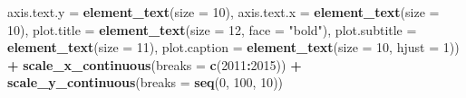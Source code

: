 \documentclass[
]{article}
\newenvironment{Shaded}{\begin{snugshade}}{\end{snugshade}}
\newcommand{\AttributeTok}[1]{\textcolor[rgb]{0.13,0.29,0.53}{#1}}
\newcommand{\DecValTok}[1]{\textcolor[rgb]{0.00,0.00,0.81}{#1}}
\newcommand{\FunctionTok}[1]{\textcolor[rgb]{0.13,0.29,0.53}{\textbf{#1}}}
\newcommand{\NormalTok}[1]{#1}
\newcommand{\SpecialCharTok}[1]{\textcolor[rgb]{0.81,0.36,0.00}{\textbf{#1}}}
\newcommand{\StringTok}[1]{\textcolor[rgb]{0.31,0.60,0.02}{#1}}
\begin{document}
\begin{Shaded}
\begin{Highlighting}[]
    \AttributeTok{axis.text.y =} \FunctionTok{element\_text}\NormalTok{(}\AttributeTok{size =} \DecValTok{10}\NormalTok{), }\AttributeTok{axis.text.x =} \FunctionTok{element\_text}\NormalTok{(}\AttributeTok{size =} \DecValTok{10}\NormalTok{),}
    \AttributeTok{plot.title =} \FunctionTok{element\_text}\NormalTok{(}\AttributeTok{size =} \DecValTok{12}\NormalTok{, }\AttributeTok{face =} \StringTok{"bold"}\NormalTok{), }\AttributeTok{plot.subtitle =} \FunctionTok{element\_text}\NormalTok{(}\AttributeTok{size =} \DecValTok{11}\NormalTok{),}
    \AttributeTok{plot.caption =} \FunctionTok{element\_text}\NormalTok{(}\AttributeTok{size =} \DecValTok{10}\NormalTok{, }\AttributeTok{hjust =} \DecValTok{1}\NormalTok{)) }\SpecialCharTok{+} \FunctionTok{scale\_x\_continuous}\NormalTok{(}\AttributeTok{breaks =} \FunctionTok{c}\NormalTok{(}\DecValTok{2011}\SpecialCharTok{:}\DecValTok{2015}\NormalTok{)) }\SpecialCharTok{+}
    \FunctionTok{scale\_y\_continuous}\NormalTok{(}\AttributeTok{breaks =} \FunctionTok{seq}\NormalTok{(}\DecValTok{0}\NormalTok{, }\DecValTok{100}\NormalTok{, }\DecValTok{10}\NormalTok{))}
\end{Highlighting}
\end{Shaded}
\end{document}
